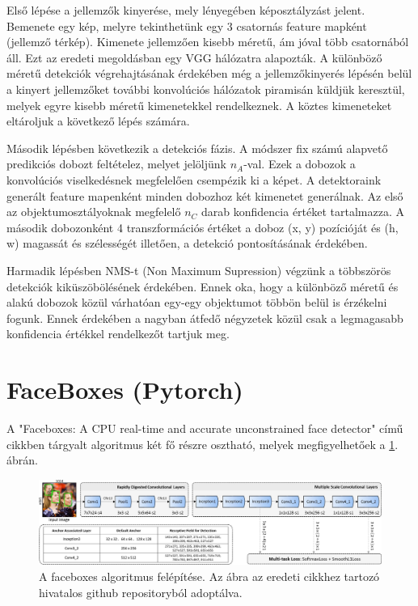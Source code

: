Első lépése a jellemzők kinyerése, mely lényegében képosztályzást jelent. Bemenete egy kép, melyre tekinthetünk egy 3 csatornás feature mapként (jellemző térkép). Kimenete jellemzően kisebb méretű, ám jóval több csatornából áll. Ezt az eredeti megoldásban egy VGG\cite{simonyan_very_2015} hálózatra alapozták. A különböző méretű detekciók végrehajtásának érdekében még a jellemzőkinyerés lépésén belül a kinyert jellemzőket további konvolúciós hálózatok piramisán küldjük keresztül, melyek egyre kisebb méretű kimenetekkel rendelkeznek. A köztes kimeneteket eltároljuk a következő lépés számára.

Második lépésben következik a detekciós fázis. A módszer fix számú alapvető predikciós dobozt feltételez, melyet jelöljünk \(n_A\)-val. Ezek a dobozok a konvolúciós viselkedésnek megfelelően csempézik ki a képet. A detektoraink generált feature mapenként minden dobozhoz két kimenetet generálnak. Az első az objektumosztályoknak megfelelő \(n_C\) darab konfidencia értéket tartalmazza. A második dobozonként 4 transzformációs értéket a doboz (x, y) pozícióját és (h, w) magassát és szélességét illetően, a detekció pontosításának érdekében.

Harmadik lépésben NMS-t (Non Maximum Supression) végzünk a többszörös detekciók kiküszöbölésének érdekében. Ennek oka, hogy a különböző méretű és alakú dobozok közül várhatóan egy-egy objektumot többön belül is érzékelni fogunk. Ennek érdekében a nagyban átfedő négyzetek közül csak a legmagasabb konfidencia értékkel rendelkezőt tartjuk meg.

\section{FaceBoxes (Pytorch)}
A "Faceboxes: A CPU real-time and accurate unconstrained face detector" című cikkben tárgyalt algoritmus két fő részre osztható, melyek megfigyelhetőek a
\ref{fig:faceboxes}. ábrán.

\begin{figure}[h]
    \centering
    \includegraphics[width=\linewidth]{figures/faceboxes_framework.jpg}
    \caption{A faceboxes algoritmus felépítése. Az ábra az eredeti cikkhez\cite{zhang_faceboxes_2018} tartozó hivatalos github repositoryból\cite{zhang_faceboxes_2021} adoptálva.}
    \label{fig:faceboxes}
\end{figure}

